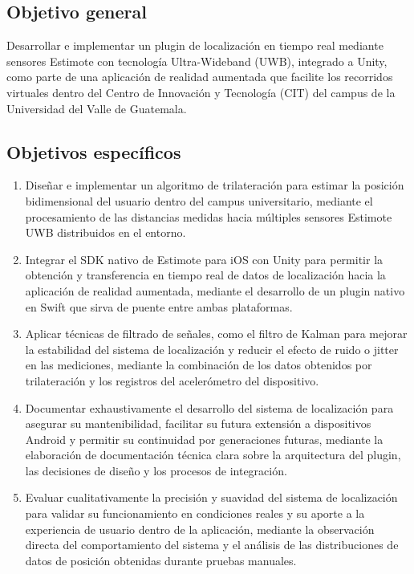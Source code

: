 \documentclass{article}
\begin{document}
\subsection{Objetivo general}
{\justify Desarrollar e implementar un plugin de localización en tiempo real mediante sensores Estimote con tecnología Ultra-Wideband (UWB), integrado a Unity, como parte de una aplicación de realidad aumentada que facilite los recorridos virtuales dentro del Centro de Innovación y Tecnología (CIT) del campus de la Universidad del Valle de Guatemala.}

\subsection{Objetivos específicos}
\begin{enumerate}[label=\thesubsection.\arabic*]
    \item Diseñar e implementar un algoritmo de trilateración
para estimar la posición bidimensional del usuario dentro del campus universitario,
mediante el procesamiento de las distancias medidas hacia múltiples sensores Estimote UWB distribuidos en el entorno.
    \item Integrar el SDK nativo de Estimote para iOS con Unity
para permitir la obtención y transferencia en tiempo real de datos de localización hacia la aplicación de realidad aumentada,
mediante el desarrollo de un plugin nativo en Swift que sirva de puente entre ambas plataformas.
    \item Aplicar técnicas de filtrado de señales, como el filtro de Kalman
para mejorar la estabilidad del sistema de localización y reducir el efecto de ruido o jitter en las mediciones,
mediante la combinación de los datos obtenidos por trilateración y los registros del acelerómetro del dispositivo.
    \item Documentar exhaustivamente el desarrollo del sistema de localización
para asegurar su mantenibilidad, facilitar su futura extensión a dispositivos Android y permitir su continuidad por generaciones futuras,
mediante la elaboración de documentación técnica clara sobre la arquitectura del plugin, las decisiones de diseño y los procesos de integración.
    \item Evaluar cualitativamente la precisión y suavidad del sistema de localización
para validar su funcionamiento en condiciones reales y su aporte a la experiencia de usuario dentro de la aplicación,
mediante la observación directa del comportamiento del sistema y el análisis de las distribuciones de datos de posición obtenidas durante pruebas manuales.       
\end{enumerate}
\end{document}

